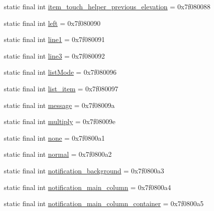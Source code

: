 \begin{DoxyCompactItemize}
\item 
static final int \mbox{\hyperlink{classcom_1_1synnapps_1_1carouselview_1_1_r_1_1id_ab11f770acbd861b5c23bb970138146da}{item\+\_\+touch\+\_\+helper\+\_\+previous\+\_\+elevation}} = 0x7f080088
\item 
static final int \mbox{\hyperlink{classcom_1_1synnapps_1_1carouselview_1_1_r_1_1id_aefa848824140814b1941152c18331411}{left}} = 0x7f080090
\item 
static final int \mbox{\hyperlink{classcom_1_1synnapps_1_1carouselview_1_1_r_1_1id_a6d7f3662df7c9bb720c8259fe6f333f9}{line1}} = 0x7f080091
\item 
static final int \mbox{\hyperlink{classcom_1_1synnapps_1_1carouselview_1_1_r_1_1id_a746f0ea6e3f061a81f10b4227df1fbb1}{line3}} = 0x7f080092
\item 
static final int \mbox{\hyperlink{classcom_1_1synnapps_1_1carouselview_1_1_r_1_1id_accb5644c5d296207b1c87b7975e3138c}{list\+Mode}} = 0x7f080096
\item 
static final int \mbox{\hyperlink{classcom_1_1synnapps_1_1carouselview_1_1_r_1_1id_a4da6fc43c559b755fc25352903a4875b}{list\+\_\+item}} = 0x7f080097
\item 
static final int \mbox{\hyperlink{classcom_1_1synnapps_1_1carouselview_1_1_r_1_1id_afa4392f665ab759a2c22d8dc9d58fc17}{message}} = 0x7f08009a
\item 
static final int \mbox{\hyperlink{classcom_1_1synnapps_1_1carouselview_1_1_r_1_1id_a9182231a7289ffb1a19836c50d3c6b5f}{multiply}} = 0x7f08009e
\item 
static final int \mbox{\hyperlink{classcom_1_1synnapps_1_1carouselview_1_1_r_1_1id_a33dc6650f49148fe6bba3949726cf0c0}{none}} = 0x7f0800a1
\item 
static final int \mbox{\hyperlink{classcom_1_1synnapps_1_1carouselview_1_1_r_1_1id_a1235f4acedaac799f64cc9314b66c8e1}{normal}} = 0x7f0800a2
\item 
static final int \mbox{\hyperlink{classcom_1_1synnapps_1_1carouselview_1_1_r_1_1id_a222add612abfe376445a0328d892cc96}{notification\+\_\+background}} = 0x7f0800a3
\item 
static final int \mbox{\hyperlink{classcom_1_1synnapps_1_1carouselview_1_1_r_1_1id_a21f063e50e4e132e3609e579d132d5d6}{notification\+\_\+main\+\_\+column}} = 0x7f0800a4
\item 
static final int \mbox{\hyperlink{classcom_1_1synnapps_1_1carouselview_1_1_r_1_1id_a3ead516394f6af539b9f5110b15b6f27}{notification\+\_\+main\+\_\+column\+\_\+container}} = 0x7f0800a5
\item 

\end{DoxyCompactItemize}
